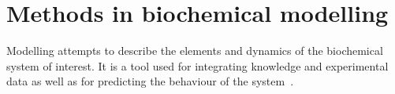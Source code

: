 

\section{Methods in biochemical modelling}

Modelling attempts to describe the elements and dynamics of the biochemical system of interest. It is a tool used for integrating knowledge and experimental data as well as for predicting the behaviour of the system~\autocite{Wilkinson:2006td}. 


